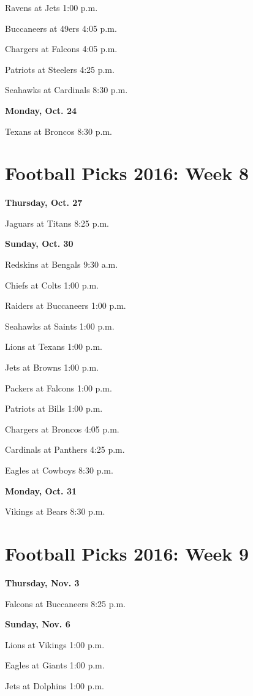 \documentclass[12pt, letterpaper]{article}
\begin{document}
Ravens at Jets 1:00 p.m.\par
Buccaneers at 49ers 4:05 p.m.\par
Chargers at Falcons 4:05 p.m.\par
Patriots at Steelers 4:25 p.m.\par
Seahawks at Cardinals 8:30 p.m.\par
\noindent \Large \textbf{Monday, Oct. 24} \par
Texans at Broncos 8:30 p.m.\par
\newpage \section*{\Huge Football Picks 2016: Week 8}
\noindent \Large \textbf{Thursday, Oct. 27} \par
Jaguars at Titans 8:25 p.m.\par
\noindent \Large \textbf{Sunday, Oct. 30} \par
Redskins at Bengals 9:30 a.m.\par
Chiefs at Colts 1:00 p.m.\par
Raiders at Buccaneers 1:00 p.m.\par
Seahawks at Saints 1:00 p.m.\par
Lions at Texans 1:00 p.m.\par
Jets at Browns 1:00 p.m.\par
Packers at Falcons 1:00 p.m.\par
Patriots at Bills 1:00 p.m.\par
Chargers at Broncos 4:05 p.m.\par
Cardinals at Panthers 4:25 p.m.\par
Eagles at Cowboys 8:30 p.m.\par
\noindent \Large \textbf{Monday, Oct. 31} \par
Vikings at Bears 8:30 p.m.\par
\newpage \section*{\Huge Football Picks 2016: Week 9}
\noindent \Large \textbf{Thursday, Nov. 3} \par
Falcons at Buccaneers 8:25 p.m.\par
\noindent \Large \textbf{Sunday, Nov. 6} \par
Lions at Vikings 1:00 p.m.\par
Eagles at Giants 1:00 p.m.\par
Jets at Dolphins 1:00 p.m.\par
\end{document}
